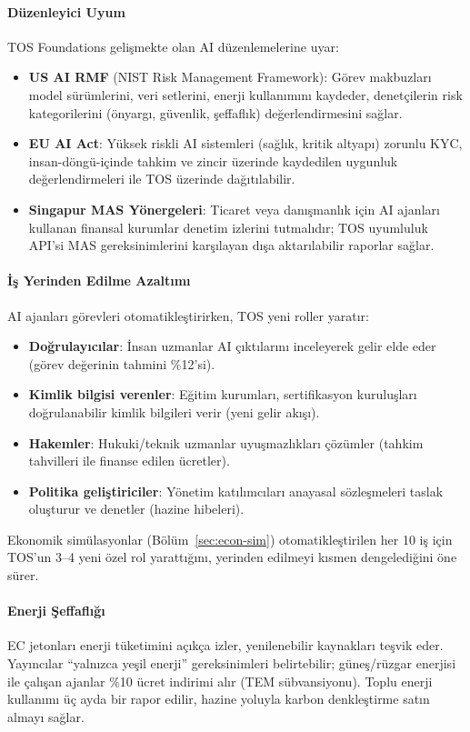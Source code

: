 \documentclass[11pt]{article}
\begin{document}
\paragraph{Düzenleyici Uyum} TOS Foundations gelişmekte olan AI düzenlemelerine uyar:
\begin{itemize}[noitemsep]
  \item \textbf{US AI RMF} (NIST Risk Management Framework): Görev makbuzları model sürümlerini, veri setlerini, enerji kullanımını kaydeder, denetçilerin risk kategorilerini (önyargı, güvenlik, şeffaflık) değerlendirmesini sağlar.
  \item \textbf{EU AI Act}: Yüksek riskli AI sistemleri (sağlık, kritik altyapı) zorunlu KYC, insan-döngü-içinde tahkim ve zincir üzerinde kaydedilen uygunluk değerlendirmeleri ile TOS üzerinde dağıtılabilir.
  \item \textbf{Singapur MAS Yönergeleri}: Ticaret veya danışmanlık için AI ajanları kullanan finansal kurumlar denetim izlerini tutmalıdır; TOS uyumluluk API'si MAS gereksinimlerini karşılayan dışa aktarılabilir raporlar sağlar.
\end{itemize}

\paragraph{İş Yerinden Edilme Azaltımı} AI ajanları görevleri otomatikleştirirken, TOS yeni roller yaratır:
\begin{itemize}[noitemsep]
  \item \textbf{Doğrulayıcılar}: İnsan uzmanlar AI çıktılarını inceleyerek gelir elde eder (görev değerinin tahmini \%12'si).
  \item \textbf{Kimlik bilgisi verenler}: Eğitim kurumları, sertifikasyon kuruluşları doğrulanabilir kimlik bilgileri verir (yeni gelir akışı).
  \item \textbf{Hakemler}: Hukuki/teknik uzmanlar uyuşmazlıkları çözümler (tahkim tahvilleri ile finanse edilen ücretler).
  \item \textbf{Politika geliştiriciler}: Yönetim katılımcıları anayasal sözleşmeleri taslak oluşturur ve denetler (hazine hibeleri).
\end{itemize}
Ekonomik simülasyonlar (Bölüm~\ref{sec:econ-sim}) otomatikleştirilen her 10 iş için TOS'un 3--4 yeni özel rol yarattığını, yerinden edilmeyi kısmen dengelediğini öne sürer.

\paragraph{Enerji Şeffaflığı} EC jetonları enerji tüketimini açıkça izler, yenilenebilir kaynakları teşvik eder. Yayıncılar ``yalnızca yeşil enerji'' gereksinimleri belirtebilir; güneş/rüzgar enerjisi ile çalışan ajanlar \%10 ücret indirimi alır (TEM sübvansiyonu). Toplu enerji kullanımı üç ayda bir rapor edilir, hazine yoluyla karbon denkleştirme satın almayı sağlar.
\end{document}
